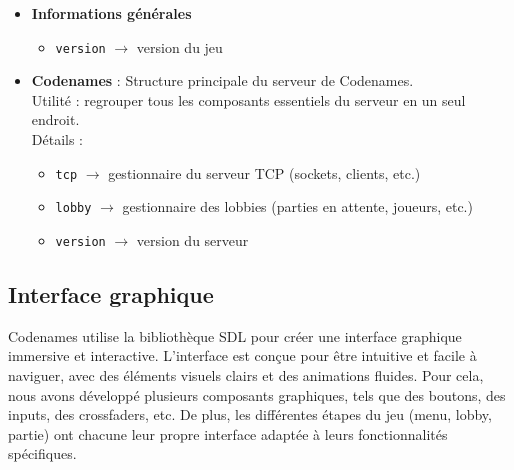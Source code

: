 \documentclass[12pt,a4paper]{article}
\begin{document}
\begin{itemize}
\begin{itemize}
                    \item \textbf{Informations générales}
                    \begin{itemize}
                        \item \texttt{version} $\rightarrow$ version du jeu
                    \end{itemize}
                \end{itemize}
        \end{itemize}

        \vspace{0.5cm}

        \begin{itemize}
            \item \textbf{Codenames} : Structure principale du serveur de Codenames.\\
                Utilité : regrouper tous les composants essentiels du serveur en un seul endroit.\\
                Détails :
                \begin{itemize}
                    \item \texttt{tcp} $\rightarrow$ gestionnaire du serveur TCP (sockets, clients, etc.)
                    \item \texttt{lobby} $\rightarrow$ gestionnaire des lobbies (parties en attente, joueurs, etc.)
                    \item \texttt{version} $\rightarrow$ version du serveur
                \end{itemize}
        \end{itemize}

        \subsection{Interface graphique}

        Codenames utilise la bibliothèque SDL pour créer une interface graphique immersive et interactive.
        L'interface est conçue pour être intuitive et facile à naviguer, avec des éléments visuels clairs et des animations fluides.
        Pour cela, nous avons développé plusieurs composants graphiques, tels que des boutons, des inputs, des crossfaders, etc.
        De plus, les différentes étapes du jeu (menu, lobby, partie) ont chacune leur propre interface adaptée à leurs fonctionnalités spécifiques.

\end{document}
